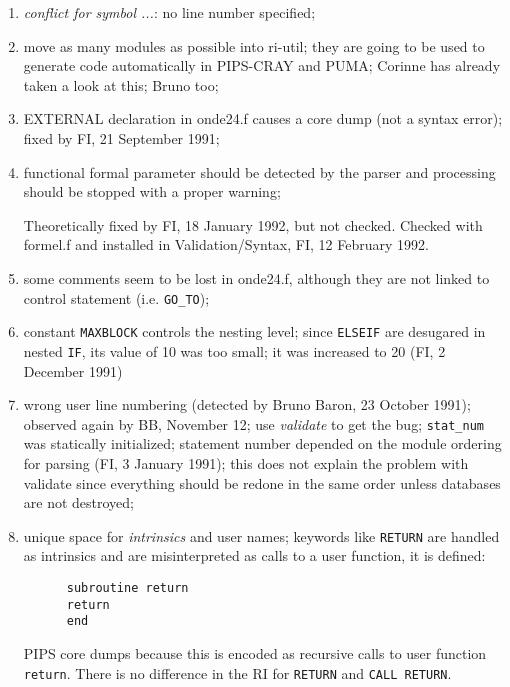 \begin{enumerate}
  \item {\em conflict for symbol ...}: no line number specified;

  \item move as many modules as possible into ri-util; they are going to
	be used to generate code automatically in PIPS-CRAY and PUMA;
	Corinne has already taken a look at this; Bruno too;

  \item EXTERNAL declaration in onde24.f causes a core dump (not a syntax
	error); fixed by FI, 21 September 1991;

  \item functional formal parameter should be detected by the parser and
	processing should be stopped with a proper warning;

	Theoretically fixed by FI, 18 January 1992, but not checked.
	Checked with formel.f and installed in Validation/Syntax,
	FI, 12 February 1992.

  \item some comments seem to be lost in onde24.f, although they are
	not linked to control statement (i.e. \verb+GO_TO+);

  \item constant \verb+MAXBLOCK+ controls the nesting level; since
	\verb+ELSEIF+ are desugared in nested \verb+IF+, its value of
	10 was too small; it was increased to 20 (FI, 2 December 1991)

  \item wrong user line numbering (detected by Bruno Baron, 23 October 1991);
	observed again by BB, November 12; use {\em validate} to get
	the bug; \verb+stat_num+ was statically initialized; statement
	number depended on the module ordering for parsing (FI, 3
	January 1991); this does not explain the problem with validate
	since everything should be redone in the same order unless
	databases are not destroyed;

  \item unique space for {\em intrinsics} and user names; keywords like
	\verb+RETURN+ are handled as intrinsics and are misinterpreted
	as calls to a user function, it is defined:

\begin{verbatim}
      subroutine return
      return
      end
\end{verbatim}

	PIPS core dumps because this is encoded as recursive calls to
	user function \verb+return+. There is no difference in the RI
	for \verb+RETURN+ and \verb+CALL RETURN+.


\end{enumerate}

